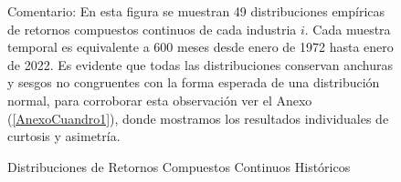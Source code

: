 \begin{landscape}
\pagestyle{lscape}
\begin{figure}
\captionsetup{labelsep = colon}
 \caption{Distribuciones de Retornos Compuestos Continuos Históricos}
\centering
  
  \label{Distribuciones}
\begin{tablenotes}[flushleft,margin=1in]
\justifying
\linespread{1}\small
\item\hspace*{-\fontdimen2\font}Comentario: En esta figura se muestran 49 distribuciones empíricas de retornos compuestos continuos de cada industria $i$. Cada muestra temporal es equivalente a 600 meses desde enero de 1972 hasta enero de 2022. Es evidente que todas las distribuciones conservan anchuras y sesgos no congruentes con la forma esperada de una distribución normal, para corroborar esta observación ver el Anexo (\ref{AnexoCuandro1}), donde mostramos los resultados individuales de curtosis y asimetría. 
\end{tablenotes} 
\end{figure}
\end{landscape}
\restoregeometry

